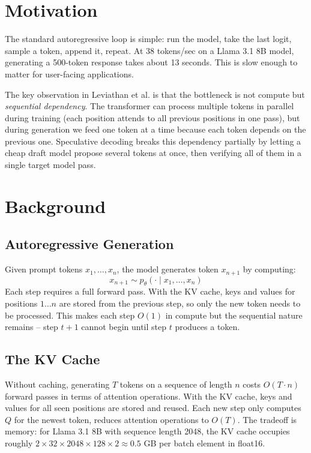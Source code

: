 \documentclass[12pt, a4paper]{article}
\begin{document}
\section{Motivation}

The standard autoregressive loop is simple: run the model, take the last logit,
sample a token, append it, repeat. At 38 tokens/sec on a Llama 3.1 8B model,
generating a 500-token response takes about 13 seconds. This is slow enough to
matter for user-facing applications.

The key observation in Leviathan et al. \cite{leviathan2023} is that the bottleneck
is not compute but \textit{sequential dependency}. The transformer can process
multiple tokens in parallel during training (each position attends to all previous
positions in one pass), but during generation we feed one token at a time because
each token depends on the previous one. Speculative decoding breaks this dependency
partially by letting a cheap draft model propose several tokens at once, then
verifying all of them in a single target model pass.

\section{Background}

\subsection{Autoregressive Generation}

Given prompt tokens $x_1, \ldots, x_n$, the model generates token $x_{n+1}$ by
computing:
\[
    x_{n+1} \sim p_\theta(\cdot \mid x_1, \ldots, x_n)
\]
Each step requires a full forward pass. With the KV cache, keys and values for
positions $1 \ldots n$ are stored from the previous step, so only the new token
needs to be processed. This makes each step $O(1)$ in compute but the sequential
nature remains -- step $t+1$ cannot begin until step $t$ produces a token.

\subsection{The KV Cache}

Without caching, generating $T$ tokens on a sequence of length $n$ costs
$O(T \cdot n)$ forward passes in terms of attention operations. With the KV cache,
keys and values for all seen positions are stored and reused. Each new step only
computes $Q$ for the newest token, reduces attention operations to $O(T)$. The
tradeoff is memory: for Llama 3.1 8B with sequence length 2048, the KV cache
occupies roughly $2 \times 32 \times 2048 \times 128 \times 2 \approx 0.5$ GB
per batch element in float16.
\end{document}
